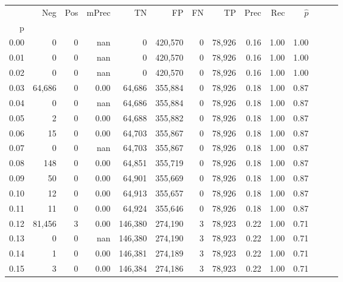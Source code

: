 \begin{tabular}{rrrrrrrrrrrrrr}
\toprule
{} &     Neg &     Pos & mPrec &       TN &       FP &      FN &      TP &  Prec &   Rec & $\hat{p}$ \\
p    &         &         &       &          &          &         &         &       &       &           \\
\midrule
0.00 &       0 &       0 &   nan &        0 &  420,570 &       0 &  78,926 &  0.16 &  1.00 &      1.00 \\
0.01 &       0 &       0 &   nan &        0 &  420,570 &       0 &  78,926 &  0.16 &  1.00 &      1.00 \\
0.02 &       0 &       0 &   nan &        0 &  420,570 &       0 &  78,926 &  0.16 &  1.00 &      1.00 \\
0.03 &  64,686 &       0 &  0.00 &   64,686 &  355,884 &       0 &  78,926 &  0.18 &  1.00 &      0.87 \\
0.04 &       0 &       0 &   nan &   64,686 &  355,884 &       0 &  78,926 &  0.18 &  1.00 &      0.87 \\
0.05 &       2 &       0 &  0.00 &   64,688 &  355,882 &       0 &  78,926 &  0.18 &  1.00 &      0.87 \\
0.06 &      15 &       0 &  0.00 &   64,703 &  355,867 &       0 &  78,926 &  0.18 &  1.00 &      0.87 \\
0.07 &       0 &       0 &   nan &   64,703 &  355,867 &       0 &  78,926 &  0.18 &  1.00 &      0.87 \\
0.08 &     148 &       0 &  0.00 &   64,851 &  355,719 &       0 &  78,926 &  0.18 &  1.00 &      0.87 \\
0.09 &      50 &       0 &  0.00 &   64,901 &  355,669 &       0 &  78,926 &  0.18 &  1.00 &      0.87 \\
0.10 &      12 &       0 &  0.00 &   64,913 &  355,657 &       0 &  78,926 &  0.18 &  1.00 &      0.87 \\
0.11 &      11 &       0 &  0.00 &   64,924 &  355,646 &       0 &  78,926 &  0.18 &  1.00 &      0.87 \\
0.12 &  81,456 &       3 &  0.00 &  146,380 &  274,190 &       3 &  78,923 &  0.22 &  1.00 &      0.71 \\
0.13 &       0 &       0 &   nan &  146,380 &  274,190 &       3 &  78,923 &  0.22 &  1.00 &      0.71 \\
0.14 &       1 &       0 &  0.00 &  146,381 &  274,189 &       3 &  78,923 &  0.22 &  1.00 &      0.71 \\
0.15 &       3 &       0 &  0.00 &  146,384 &  274,186 &       3 &  78,923 &  0.22 &  1.00 &      0.71 \\

\end{tabular}
